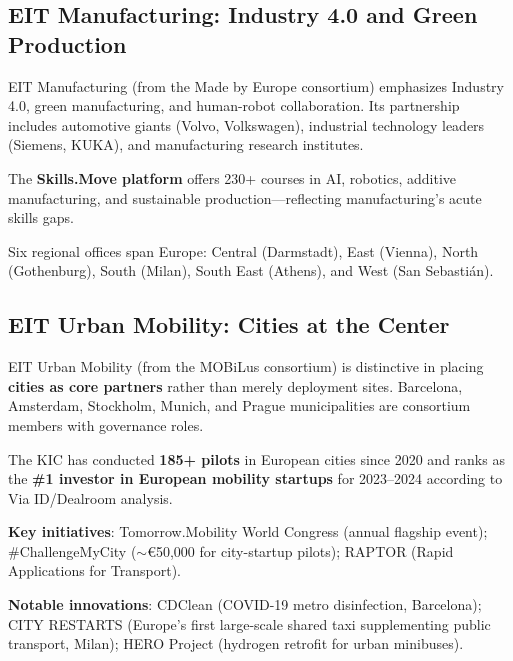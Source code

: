 \documentclass[../main.tex]{subfiles}
\begin{document}
\subsection*{EIT Manufacturing: Industry 4.0 and Green Production}

EIT Manufacturing (from the Made by Europe consortium) emphasizes Industry 4.0, green manufacturing, and human-robot collaboration. Its partnership includes automotive giants (Volvo, Volkswagen), industrial technology leaders (Siemens, KUKA), and manufacturing research institutes.

The \textbf{Skills.Move platform} offers 230+ courses in AI, robotics, additive manufacturing, and sustainable production---reflecting manufacturing's acute skills gaps.

Six regional offices span Europe: Central (Darmstadt), East (Vienna), North (Gothenburg), South (Milan), South East (Athens), and West (San Sebastián).

\subsection*{EIT Urban Mobility: Cities at the Center}

EIT Urban Mobility (from the MOBiLus consortium) is distinctive in placing \textbf{cities as core partners} rather than merely deployment sites. Barcelona, Amsterdam, Stockholm, Munich, and Prague municipalities are consortium members with governance roles.

The KIC has conducted \textbf{185+ pilots} in European cities since 2020 and ranks as the \textbf{\#1 investor in European mobility startups} for 2023--2024 according to Via ID/Dealroom analysis.

\textbf{Key initiatives}: Tomorrow.Mobility World Congress (annual flagship event); \#ChallengeMyCity ($\sim$€50,000 for city-startup pilots); RAPTOR (Rapid Applications for Transport).

\textbf{Notable innovations}: CDClean (COVID-19 metro disinfection, Barcelona); CITY RESTARTS (Europe's first large-scale shared taxi supplementing public transport, Milan); HERO Project (hydrogen retrofit for urban minibuses).


\end{document}
